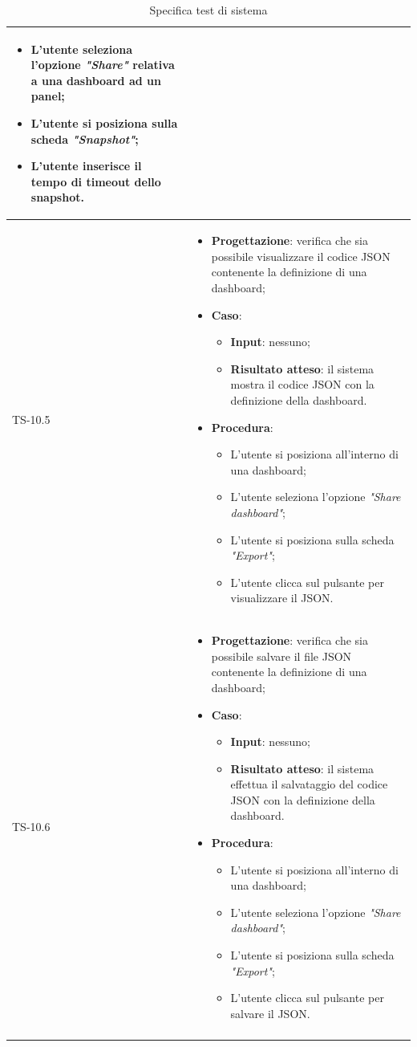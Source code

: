 \begin{longtable}{|C{2.5cm}|C{13cm}|}
\begin{itemize}
\begin{itemize}
		\item L'utente seleziona l'opzione \emph{"Share"} relativa a una dashboard ad un panel;
		\item L'utente si posiziona sulla scheda \emph{"Snapshot"};
		\item L'utente inserisce il tempo di timeout dello snapshot.
	\end{itemize} 
\end{itemize}
	\\
	\hline
	{TS-10.5} &
\begin{itemize}
	\item \textbf{Progettazione}: verifica che sia possibile visualizzare il
	codice JSON contenente la definizione di una dashboard;
	\item \textbf{Caso}: 
	\begin{itemize}
		\item \textbf{Input}: nessuno;
		\item \textbf{Risultato atteso}: il sistema mostra il codice JSON con la definizione della dashboard.
	\end{itemize}
	\item \textbf{Procedura}:
	\begin{itemize}
		\item L'utente si posiziona all'interno di una dashboard;
		\item L'utente seleziona l'opzione \emph{"Share dashboard"};
		\item L'utente si posiziona sulla scheda \emph{"Export"};
		\item L'utente clicca sul pulsante per visualizzare il JSON.
	\end{itemize} 
\end{itemize}
	  \\
	\hline
	{TS-10.6} & 
\begin{itemize}
	\item \textbf{Progettazione}: verifica che sia possibile salvare il file
	JSON contenente la definizione di una dashboard;
	\item \textbf{Caso}: 
	\begin{itemize}
		\item \textbf{Input}: nessuno;
		\item \textbf{Risultato atteso}: il sistema effettua il salvataggio del codice JSON con la definizione della dashboard.
	\end{itemize}
	\item \textbf{Procedura}:
	\begin{itemize}
		\item L'utente si posiziona all'interno di una dashboard;
		\item L'utente seleziona l'opzione \emph{"Share dashboard"};
		\item L'utente si posiziona sulla scheda \emph{"Export"};
		\item L'utente clicca sul pulsante per salvare il JSON.
	\end{itemize} 
\end{itemize}
	 \\
	\hline
	\caption{Specifica test di sistema}
	\label{tabella:specifica TS}
\end{longtable}
